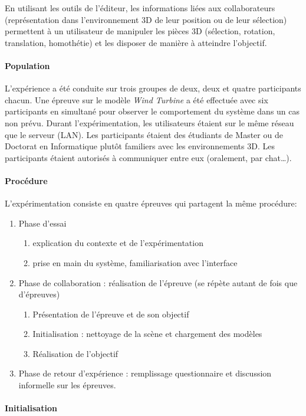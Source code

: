 En utilisant les outils de l'éditeur, les informations liées aux collaborateurs 
(représentation dans l'environnement \gls{3D} de leur position ou de leur sélection) permettent à un 
utilisateur de manipuler les pièces 3D (sélection, rotation, translation, 
homothétie) et les disposer de manière à atteindre l'objectif. 
\paragraph{Population}
L'expérience a été conduite sur trois groupes de deux, deux et quatre participants 
chacun. Une épreuve sur le modèle \textit{Wind Turbine} a été effectuée avec six participants 
en simultané pour observer le comportement du système dans un cas non prévu.
Durant l'expérimentation, les utilisateurs étaient sur le même réseau que le serveur 
(\gls{LAN}). 
Les participants étaient des étudiants de Master ou de Doctorat en Informatique 
plutôt familiers avec les environnements \gls{3D}. Les participants étaient 
autorisés à 
communiquer entre eux (oralement, par chat\dots).
\paragraph{Procédure}
L'expérimentation consiste en quatre épreuves qui partagent la même procédure:
\begin{enumerate}
	\item Phase d'essai 
	\begin{enumerate}
		\item explication du contexte et de l'expérimentation 
		\item prise en main du système, familiarisation avec 
		l'interface 
	\end{enumerate}
	\item Phase de collaboration : réalisation de l'épreuve (se répète autant de fois 
	que d'épreuves)
	\begin{enumerate}
		\item Présentation de l'épreuve et de son objectif
		\item Initialisation : nettoyage de la scène et chargement des modèles
		\item Réalisation de l'objectif
	\end{enumerate}
	\item Phase de retour d'expérience : remplissage questionnaire et discussion 
	informelle sur les épreuves.
\end{enumerate}

\paragraph{Initialisation}

